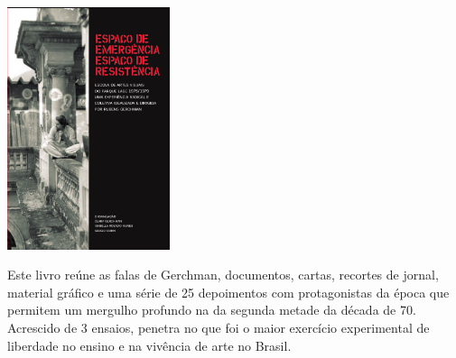 \pagebreak

\hspace{.5cm}

\begin{center}
\hspace*{-.5cm}\includegraphics[width=47.5mm]{./imgs/lage.jpeg}
\end{center}

\hspace*{-7cm}\hrulefill\hspace*{-7cm}

\medskip

\noindent{}Este livro reúne as falas de Gerchman, documentos, cartas,
recortes de jornal, material gráfico e uma série de 25 depoimentos com
protagonistas da época que permitem
um mergulho profundo na  da segunda metade da década de 70. Acrescido de 3 ensaios, {} penetra no que foi o maior exercício experimental de liberdade no ensino e na vivência de arte no Brasil.

\hspace{.5cm}
\vfill

\hspace*{-.4cm}\begin{minipage}[c]{1\linewidth}
\small{
{}}
\end{minipage}


